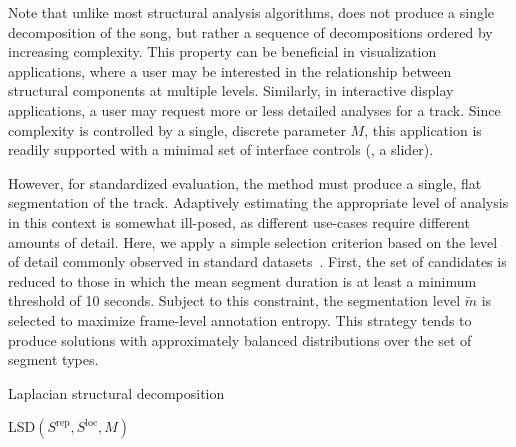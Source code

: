 \documentclass{article}
\begin{document}
Note that unlike most structural analysis algorithms,  does not produce a
single decomposition of the song, but rather a sequence of decompositions ordered by 
increasing complexity.  This property can be beneficial in visualization applications,
where a user may be interested in the relationship between structural components at
multiple levels.  Similarly, in interactive display applications, a user may request 
more or less detailed analyses for a track.  Since complexity is controlled by
a single, discrete parameter $M$, this application is readily supported with a minimal
set of interface controls (\eg, a slider).

However, for standardized evaluation, the method must produce a single, flat
segmentation of the track.  Adaptively estimating the appropriate level of analysis in
this context is somewhat ill-posed, as different use-cases require different amounts of 
detail.  Here, we apply a simple selection criterion based on the level of detail
commonly observed in standard datasets~\cite{harte2010towards,smith2011design}.  
First, the set of candidates is reduced to those in which the mean segment duration is 
at least a minimum threshold of 10 seconds.  
Subject to this constraint, the segmentation level $\tilde{m}$ is selected to maximize
frame-level annotation entropy.  This strategy tends to produce solutions with 
approximately balanced distributions over the set of segment types.  




\begin{algorithm}[t]
\caption{Laplacian structural decomposition\label{lsd}}
\begin{algorithmic}[1]
\item[]
\item[]
{\sc LSD}$(S^\text{rep}, S^\text{loc}, M)$
 
 
 
\ENDFOR{}
\end{algorithmic}
\end{algorithm}
\end{document}
